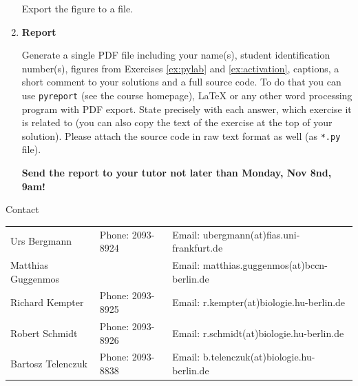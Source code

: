 \documentclass[12pt, a4]{article}
\begin{document}
\begin{enumerate}
\begin{enumerate}
        \end{enumerate}
    
        Export the figure to a file.

    \item \textbf {Report}

    Generate a single PDF file including your name(s), student identification number(s), figures from Exercises \ref{ex:pylab} and \ref{ex:activation}, captions, a short comment to your solutions and a full source code. To do that you can use  \texttt{pyreport} (see the course homepage), LaTeX or any other word processing program with PDF export. State precisely with each answer, which exercise it is related to (you can also copy the text of the exercise at the top of your solution). Please attach the source code in raw text format as well (as \texttt{*.py} file).
    
    \textbf{Send the report to your tutor not later than Monday, Nov 8nd, 9am!} 
\end{enumerate}

\vfill
\centerline{\CAP Contact}
\CAP

\begin{tabular}{lll}
Urs Bergmann & Phone: 2093-8924 & Email: ubergmann(at)fias.uni-frankfurt.de \\
Matthias Guggenmos & & Email: matthias.guggenmos(at)bccn-berlin.de \\
Richard Kempter \hfill & Phone: 2093-8925 \hfill & Email: r.kempter(at)biologie.hu-berlin.de \\
Robert Schmidt & Phone: 2093-8926 & Email: r.schmidt(at)biologie.hu-berlin.de \\
Bartosz Telenczuk & Phone: 2093-8838 & Email: b.telenczuk(at)biologie.hu-berlin.de \\
\end{tabular}
\end{document}
